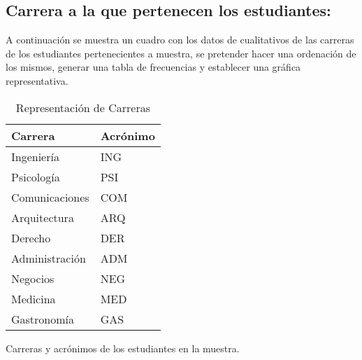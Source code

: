 \subsection{Carrera a la que pertenecen los estudiantes:}

A continuación se muestra un cuadro con los datos de cualitativos de las carreras de los estudiantes pertenecientes a muestra, se pretender hacer una ordenación de los mismos, generar una tabla de frecuencias y establecer una gráfica representativa.

\begin{table}[H]
  \centering
  \hspace*{-2cm} %
  \begin{minipage}{0.35\textwidth} %
    \centering
    \begin{tabular}{l @{\hskip 0.6cm} l}
      \hline
      \textbf{Carrera} & \textbf{Acrónimo} \\ \hline
      Ingeniería       & \small{ING}                \\ \hline
      Psicología       & \small{PSI}                \\ \hline
      Comunicaciones   & \small{COM}                \\ \hline
      Arquitectura     & \small{ARQ}                \\ \hline
      Derecho          & \small{DER}                \\ \hline
      Administración   & \small{ADM}                \\ \hline
      Negocios         & \small{NEG}                \\ \hline
      Medicina         & \small{MED}                \\ \hline
      Gastronomía      & \small{GAS}               \\ \hline
    \end{tabular}
    \caption{Carreras y acrónimos de los estudiantes en la muestra.}
    \label{tab:carreras-acronimos}
  \end{minipage}
  \hspace{0.2cm} %
  \begin{minipage}{0.45\textwidth} %
    \centering
    \caption{Representación de Carreras}

\end{minipage}
\end{table}
